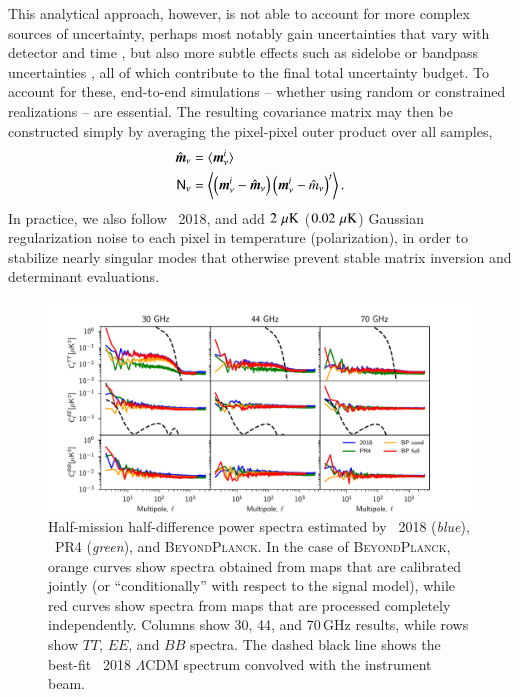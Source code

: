 \documentclass[twocolumn]{aa}
\newcommand{\m}[0]{\vec{m}}
\newcommand{\N}[0]{\tens{N}}
\newcommand{\BP}{\textsc{BeyondPlanck}}
\begin{document}
This analytical approach, however, is not able to account for more
complex sources of uncertainty, perhaps most notably gain
uncertainties that vary with detector and time \citep{bp07}, but also
more subtle effects such as sidelobe \citep{bp08} or bandpass
uncertainties \citep{bp09}, all of which contribute to the final total
uncertainty budget. To account for these, end-to-end simulations --
whether using random or constrained realizations -- are
essential. The resulting covariance matrix may then be constructed
simply by averaging the pixel-pixel outer product over all samples,
\begin{align}
  \hat{\m}_{\nu} &= \langle\m^i_{\nu}\rangle \\
  \N_{\nu} &= \left\langle\left( \m^i_{\nu}-\hat{\m}_{\nu} \right)
  \left( \m^i_{\nu}-\hat{m}_{\nu} \right)^t\right\rangle.
  \label{eq:covmat}
\end{align}
In practice, we also follow \Planck\ 2018, and add $2\,\muK$
($0.02\,\muK$) Gaussian regularization noise to each pixel in
temperature (polarization), in order to stabilize nearly singular
modes that otherwise prevent stable matrix inversion and determinant
evaluations.

\begin{figure}

  \includegraphics[width=\linewidth]{figs/diff_power_spectrum.pdf}
  \caption{Half-mission half-difference power spectra estimated by \Planck\ 2018 (\emph{blue}), \Planck\ PR4 (\emph{green}), and \BP. In the case of \BP, orange curves show spectra obtained from maps that are calibrated jointly (or ``conditionally'' with respect to the signal model), while red curves show spectra from maps that are processed completely independently. Columns show 30, 44, and 70\,GHz results, while rows show $TT$, $EE$, and $BB$ spectra. The dashed black line shows the best-fit \Planck\ 2018 $\Lambda$CDM spectrum convolved with the instrument beam.  }
  \label{fig:halfdiff_powspec}  
\end{figure}
\end{document}
